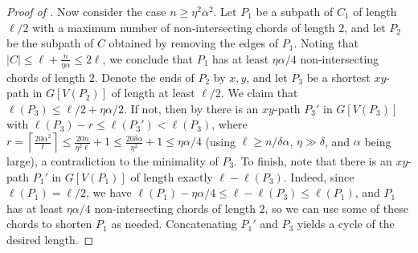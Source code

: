 \documentclass[11pt,english]{article}
\theoremstyle{plain}
\theoremstyle{definition}
\theoremstyle{remark}
\newcommand{\ceil}[1]{
	\left\lceil #1 \right\rceil
}
\begin{document}
\begin{proof}[Proof of ]
			Now consider the case $n \ge \eta^2 \alpha^2$. Let $P_1$ be a subpath of $C_1$ of length $\ell/2$ with a maximum number of non-intersecting chords of length $2$, and let $P_2$ be the subpath of $C$ obtained by removing the edges of $P_1$. 
			Noting that $|C| \le \ell + \frac{n}{\eta \alpha} \le 2\ell$, we conclude that $P_1$ has at least $\eta\alpha/4$ non-intersecting chords of length $2$.
			Denote the ends of $P_2$ by $x,y$, and let $P_3$ be a shortest $xy$-path in $G[V(P_2)]$ of length at least $\ell/2$. We claim that $\ell(P_3) \le \ell/2 + \eta \alpha/2$.
			If not, then by  there is an $xy$-path $P_3'$ in $G[V(P_3)]$ with $\ell(P_3) - r \le \ell(P_3') < \ell(P_3)$, where $r = \ceil{\frac{20\alpha^2}{\ell}} \le \frac{20n}{\eta^2 \ell} + 1 \le \frac{20\delta \alpha}{\eta^2} + 1 \le \eta\alpha/4$ (using $\ell \ge n/\delta \alpha$, $\eta \gg \delta$, and $\alpha$ being large), a contradiction to the minimality of $P_3$.
			To finish, note that there is an $xy$-path $P_1'$ in $G[V(P_1)]$ of length exactly $\ell - \ell(P_3)$. Indeed, since $\ell(P_1) = \ell/2$, we have $\ell(P_1) - \eta \alpha/4 \le \ell - \ell(P_3) \le \ell(P_1)$, and $P_1$ has at least $\eta \alpha/4$ non-intersecting chords of length $2$, so we can use some of these chords to shorten $P_1$ as needed. Concatenating $P_1'$ and $P_3$ yields a cycle of the desired length.
		\end{proof}
\end{document}
